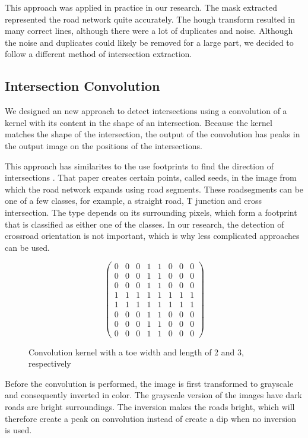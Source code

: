 This approach was applied in practice in our research. The mask extracted
represented the road network quite accurately. The hough transform resulted in
many correct lines, although there were a lot of duplicates and noise. Although
the noise and duplicates could likely be removed for a large part, we decided
to follow a different method of intersection extraction. 

\subsection{Intersection Convolution}
We designed an new approach to detect intersections using a convolution of
a kernel with its content in the shape of an intersection. Because the kernel
matches the shape of the intersection, the output of the convolution has peaks
in the output image on the positions of the intersections.

This approach has similarites to the use footprints to find the direction of
intersections \cite{hu2007road}. That paper creates certain points, called
seeds, in the image from which the road network expands using road segments.
These roadsegments can be one of a few classes, for example, a straight road,
T junction and cross intersection. The type depends on its surrounding pixels,
which form a footprint that is classified as either one of the classes. In our
research, the detection of crossroad orientation is not important, which is why
less complicated approaches can be used.

\begin{figure}
\[
 \begin{pmatrix}
 0 & 0 & 0 & 1 & 1 & 0 & 0 & 0\\
 0 & 0 & 0 & 1 & 1 & 0 & 0 & 0\\
 0 & 0 & 0 & 1 & 1 & 0 & 0 & 0\\
 1 & 1 & 1 & 1 & 1 & 1 & 1 & 1\\
 1 & 1 & 1 & 1 & 1 & 1 & 1 & 1\\
 0 & 0 & 0 & 1 & 1 & 0 & 0 & 0\\
 0 & 0 & 0 & 1 & 1 & 0 & 0 & 0\\
 0 & 0 & 0 & 1 & 1 & 0 & 0 & 0
 \end{pmatrix}
\] 
\caption{Convolution kernel with a toe width and length of 2 and 3,
respectively}
\label{fig:conv_kernel}
\end{figure}

Before the convolution is performed, the image is first transformed to
grayscale and consequently inverted in color. The grayscale version of the
images have dark roads are bright surroundings. The inversion makes the roads
bright, which will therefore create a peak on convolution instead of create
a dip when no inversion is used.  

